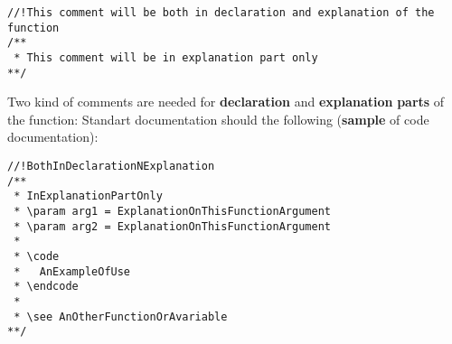 \begin{VerbInclude}\begin{verbatim}//!This comment will be both in declaration and explanation of the function
/**
 * This comment will be in explanation part only
**/
\end{verbatim}
\end{VerbInclude}


Two kind of comments are needed for {\bf declaration} and {\bf explanation} {\bf parts} of the function: Standart documentation should the following ({\bf sample} of code documentation): 

\begin{VerbInclude}\begin{verbatim}//!BothInDeclarationNExplanation
/** 
 * InExplanationPartOnly
 * \param arg1 = ExplanationOnThisFunctionArgument
 * \param arg2 = ExplanationOnThisFunctionArgument
 *
 * \code
 *   AnExampleOfUse
 * \endcode
 *
 * \see AnOtherFunctionOrAvariable
**/
\end{verbatim}
\end{VerbInclude}


